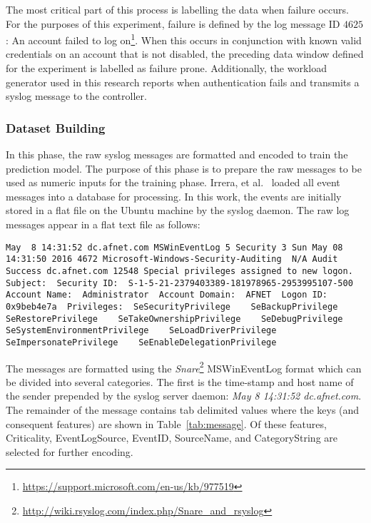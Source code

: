 The most critical part of this process is labelling the data when failure
occurs.  For the purposes of this experiment, failure is defined by the log
message ID $4625$: An account failed to log
on\footnote{\url{https://support.microsoft.com/en-us/kb/977519}}.  When this
occurs in conjunction with known valid credentials on an account that is not
disabled, the preceding data window defined for the experiment is labelled as
failure prone.  Additionally, the workload generator used in this research
reports when authentication fails and transmits a syslog message to the
controller.  

\subsubsection{Dataset Building}
In this phase, the raw syslog messages are formatted and encoded to train the
prediction model.  The purpose of this phase is to prepare the raw messages to
be used as numeric inputs for the training phase.  Irrera, et
al.~\cite{irrera2015} loaded all event messages into a database for processing.
In this work, the events are initially stored in a flat file on the Ubuntu
machine by the syslog daemon.  The raw log messages appear in a flat text file
as follows:

\begin{lstlisting}
May  8 14:31:52 dc.afnet.com MSWinEventLog 5 Security 3 Sun May 08 14:31:50 2016 4672 Microsoft-Windows-Security-Auditing  N/A Audit Success dc.afnet.com 12548 Special privileges assigned to new logon.  Subject:  Security ID:  S-1-5-21-2379403389-181978965-2953995107-500  Account Name:  Administrator  Account Domain:  AFNET  Logon ID:  0x9beb4e7a  Privileges:  SeSecurityPrivilege    SeBackupPrivilege    SeRestorePrivilege    SeTakeOwnershipPrivilege    SeDebugPrivilege    SeSystemEnvironmentPrivilege    SeLoadDriverPrivilege    SeImpersonatePrivilege    SeEnableDelegationPrivilege
\end{lstlisting}

The messages are formatted using the
\emph{Snare}\footnote{\url{http://wiki.rsyslog.com/index.php/Snare\_and\_rsyslog}}
MSWinEventLog format which can be divided into several categories.  The first
is the time-stamp and host name of the sender prepended by the syslog server
daemon: \emph{May 8 14:31:52 dc.afnet.com}.  The remainder of the message
contains tab delimited values where the keys (and consequent features) are
shown in Table~\ref{tab:message}.  Of these features, Criticality,
EventLogSource, EventID, SourceName, and CategoryString are selected for
further encoding.

